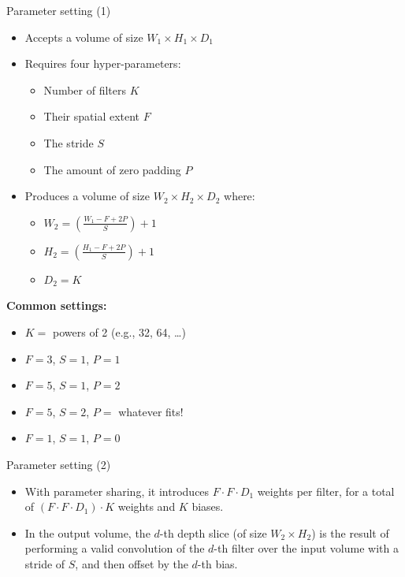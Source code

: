 \documentclass[default, aspectratio=169]{beamer}
\begin{document}
	\begin{frame}{Parameter setting (1)}
		\begin{minipage}{0.50\textwidth} %
			\begin{itemize}
				\item Accepts a volume of size $W_1 \times H_1 \times D_1$
				\item Requires four hyper-parameters:
				\begin{itemize}
					\item Number of filters $K$
					\item Their spatial extent $F$
					\item The stride $S$
					\item The amount of zero padding $P$
				\end{itemize}
				
				\item Produces a volume of size $W_2 \times H_2 \times D_2$ where:
				\begin{itemize}
					\item $W_2 = \left( \frac{W_1 - F + 2P}{S} \right) + 1$
					\item $H_2 = \left( \frac{H_1 - F + 2P}{S} \right) + 1$
					\vspace{2pt}
					\item $D_2 = K$
				\end{itemize}
			\end{itemize}
		\end{minipage}
		\hfill %
		\begin{minipage}{0.45\textwidth} %
			\textbf{Common settings:}
			\begin{itemize}
				\item $K =$ powers of 2 (e.g., 32, 64, \dots)
				\item $F = 3$, $S = 1$, $P = 1$
				\item $F = 5$, $S = 1$, $P = 2$
				\item $F = 5$, $S = 2$, $P = $ whatever fits!
				\item $F = 1$, $S = 1$, $P = 0$
			\end{itemize}
		\end{minipage}
	\end{frame}
	\begin{frame}{Parameter setting (2)}
		\begin{itemize}
			\item With parameter sharing, it introduces $F \cdot F \cdot D_1$ weights per filter, for a total of $(F \cdot F \cdot D_1) \cdot K$ weights and $K$ biases.
			\item In the output volume, the $d$-th depth slice (of size $W_2 \times H_2$) is the result of performing a valid convolution of the $d$-th filter over the input volume with a stride of $S$, and then offset by the $d$-th bias.
		\end{itemize}
	\end{frame}
\end{document}
